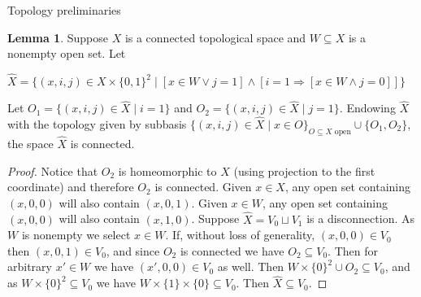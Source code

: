 \documentclass{amsart}
\theoremstyle{definition}\newtheorem{theorem}{Theorem}
\theoremstyle{definition}\newtheorem{bigtheorem}{Theorem}
\numberwithin{theorem}{section}
\theoremstyle{definition}\newtheorem{corollary}[theorem]{Corollary}
\theoremstyle{definition}\newtheorem{proposition}[theorem]{Proposition}
\theoremstyle{definition}\newtheorem{definition}[theorem]{Definition}
\theoremstyle{definition}\newtheorem{question}[theorem]{Question}
\theoremstyle{definition}\newtheorem{example}[theorem]{Example}
\theoremstyle{definition}\newtheorem{remark}[theorem]{Remark}
\theoremstyle{definition}\newtheorem{note}[theorem]{Note}
\theoremstyle{definition}\newtheorem{lemma}[theorem]{Lemma}
\theoremstyle{definition}\newtheorem{fact}[theorem]{Fact}
\theoremstyle{definition}\newtheorem{define}[theorem]{Definition}
\theoremstyle{definition}\newtheorem{definitions}[theorem]{Definitions}
\theoremstyle{definition}\newtheorem{claim}[theorem]{Claim}
\theoremstyle{definition}\newtheorem{obs}[theorem]{Observation}
\theoremstyle{definition}\newtheorem{construction}[theorem]{Construction}
\begin{document}
\begin{section}{Topology preliminaries}
\begin{lemma}\label{makingregularity}  Suppose $X$ is a connected topological space and $W \subseteq X$ is a nonempty open set.  Let

\begin{center}

$\hat{X} = \{(x, i, j) \in X \times \{0, 1\}^2 \mid [x\in W \vee j = 1] \wedge [i = 1 \Rightarrow [x\in W \wedge j = 0]]\}$

\end{center}

\noindent Let $O_1 = \{(x, i, j)\in \hat{X} \mid i = 1\}$ and $O_2 = \{(x, i, j)\in \hat{X} \mid j = 1\}$.  Endowing $\hat{X}$ with the topology given by subbasis $\{(x, i, j)\in \hat{X} \mid x\in O\}_{O \subseteq X \text{ open}} \cup \{O_1, O_2\}$, the space $\hat{X}$ is connected.

\end{lemma}

\begin{proof}  Notice that $O_2$ is homeomorphic to $X$ (using projection to the first coordinate) and therefore $O_2$ is connected.  Given $x\in X$, any open set containing $(x, 0, 0)$ will also contain $(x, 0, 1)$.  Given $x\in W$, any open set containing $(x, 0, 0)$ will also contain $(x, 1, 0)$.  Suppose $\hat{X} = V_0 \sqcup V_1$ is a disconnection.  As $W$ is nonempty we select $x\in W$.  If, without loss of generality, $(x, 0, 0) \in V_0$ then $(x, 0, 1) \in V_0$, and since $O_2$ is connected we have $O_2 \subseteq V_0$.  Then for arbitrary $x'\in W$ we have $(x', 0, 0) \in V_0$ as well.  Then $W \times \{0\}^2 \cup O_2 \subseteq V_0$, and as $W\times \{0\}^2 \subseteq V_0$ we have $W \times \{1\} \times \{0\} \subseteq V_0$.  Then $\hat{X} \subseteq V_0$.
\end{proof}

\end{section}
\end{document}

